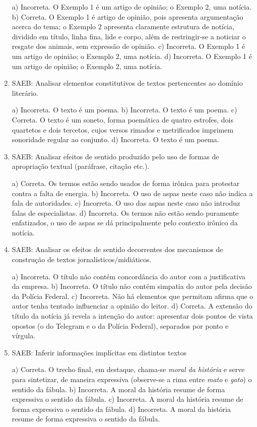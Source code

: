\begin{enumerate}
a) Incorreta. O Exemplo 1 é um artigo de opinião; o Exemplo 2, uma notícia.
b) Correta. O Exemplo 1 é artigo de opinião, pois apresenta
argumentação acerca do tema; o Exemplo 2 apresenta claramente estrutura
de notícia, dividido em título, linha fina, lide e corpo, além de 
restringir-se a noticiar o resgate dos animais, sem expressão de 
opinião. 
c) Incorreta. O Exemplo 1 é um artigo de opinião; o Exemplo 2, uma notícia.
d) Incorreta. O Exemplo 1 é um artigo de opinião; o Exemplo 2, uma notícia.

	\item
SAEB: Analisar elementos constitutivos de textos pertencentes ao domínio
literário.

a) Incorreta. O texto é um poema.
b) Incorreta. O texto é um poema.
c) Correta. O texto é um soneto, forma poemática de quatro estrofes, 
dois quartetos e dois tercetos, cujos versos rimados e metrificados 
imprimem sonoridade regular ao conjunto. 
d) Incorreta. O texto é um poema.

	\item
SAEB: Analisar efeitos de sentido produzido pelo uso de formas
de apropriação textual (paráfrase, citação etc.).

a) Correta. Os termos estão sendo usados de forma irônica para protestar
contra a falta de energia.
b) Incorreta. O uso de aspas neste caso não indica a fala de
autoridades.
c) Incorreta. O uso das aspas neste caso não introduz falas
de especialistas.
d) Incorreta. Os termos não estão sendo puramente enfatizados, o uso de
aspas se dá principalmente pelo contexto irônico da notícia.

	\item
SAEB: Analisar os efeitos de sentido decorrentes dos mecanismos de 
construção de textos jornalísticos/midiáticos.

a) Incorreta. O título não contém concordância do autor com a justificativa da empresa.
b) Incorreta. O título não contém simpatia do autor pela decisão da Polícia Federal.
c) Incorreta. Não há elementos que permitam afirma que o autor tenha tentado
influenciar a opinião do leitor.
d) Correta. A extensão do título da notícia já revela a intenção do autor: 
apresentar dois pontos de vista opostos (o do Telegram e o da Polícia Federal),
separados por ponto e vírgula.

	\item
SAEB: Inferir informações implícitas em distintos textos

a) Correta. O trecho final, em destaque, chama-se \textit{moral da história}
e serve para sintetizar, de maneira expressiva (observe-se a rima entre
\textit{mato} e \textit{gato}) o sentido da fábula. 
b) Incorreta. A moral da história resume de forma expressiva o sentido da 
fábula.
c) Incorreta. A moral da história resume de forma expressiva o sentido da 
fábula.
d) Incorreta. A moral da história resume de forma expressiva o sentido da 
fábula.


\end{enumerate}
